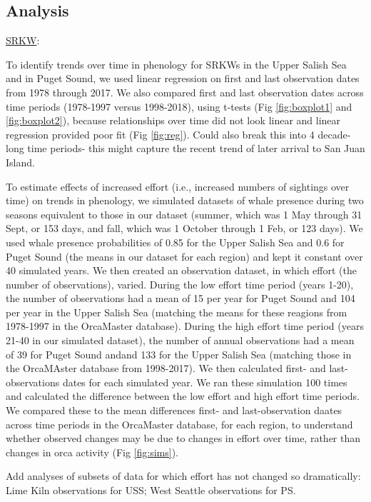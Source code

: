 \documentclass{article}
\begin{document}
\subsection* {Analysis}
\underline{SRKW}:
\par To identify trends over time in phenology for SRKWs in the Upper Salish Sea and in Puget Sound, we used linear regression on first  and last observation dates from 1978 through 2017. We also compared first and last observation dates across time periods (1978-1997 versus 1998-2018), using t-tests (Fig \ref{fig:boxplot1} and \ref{fig:boxplot2}), because relationships over time did not look linear and linear regression provided poor fit (Fig \ref{fig:reg}). Could also break this into 4 decade-long time periods- this might capture the recent trend of later arrival to San Juan Island. 
\par  To estimate effects of increased effort (i.e., increased numbers of sightings over time) on trends in phenology, we simulated datasets of whale presence during two seasons equivalent to those in our dataset (summer, which was 1 May through 31 Sept, or 153 days, and fall, which was 1 October through 1 Feb, or 123 days). We used whale presence probabilities of 0.85 for the Upper Salish Sea and 0.6 for Puget Sound (the means in our dataset for each region) and kept it constant over 40 simulated years. We then created an observation dataset, in which effort (the number of observations), varied. During the low effort time period (years 1-20), the number of observations had a mean of 15 per year for Puget Sound and 104 per year in the Upper Salish Sea (matching the means for these reagions from 1978-1997 in the OrcaMaster database).  During the high effort time period (years 21-40 in our simulated dataset), the number of annual observations had a mean of 39 for Puget Sound andand 133 for the Upper Salish Sea (matching those in the OrcaMAster database from 1998-2017). We then calculated first- and last- observations dates for each simulated year. We ran these simulation 100 times and calculated the difference between the low effort and high effort time periods. We compared these to the mean differences first- and last-observation daates across time periods in the OrcaMaster database, for each region, to understand whether observed changes may be due to changes in effort over time, rather than changes in orca activity (Fig \ref{fig:sims}).
\par Add analyses of subsets of data for which effort has not changed so dramatically: Lime Kiln observations for USS; West Seattle observations for PS.
\end{document}
